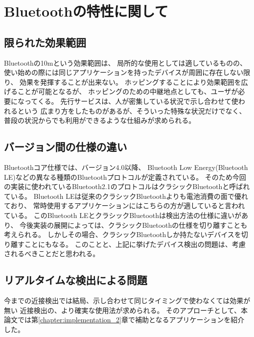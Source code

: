 \section{Bluetoothの特性に関して}

\subsection{限られた効果範囲}

Bluetoothの10mという効果範囲は、
局所的な使用としては適しているものの、
使い始めの際には同じアプリケーションを持ったデバイスが周囲に存在しない限り、
効果を発揮することが出来ない。
ホッピングすることにより効果範囲を広げることが可能となるが、
ホッピングのための中継地点としても、ユーザが必要になってくる。
先行サービスは、人が密集している状況で示し合わせて使われるという
広まり方をしたものがあるが、そういった特殊な状況だけでなく、
普段の状況からでも利用ができるような仕組みが求められる。

\subsection{バージョン間の仕様の違い}

Bluetoothコア仕様では、バージョン4.0以降、
Bluetooth Low Energy(Bluetooth LE)などの異なる種類のBluetoothプロトコルが定義されている。
そのため今回の実装に使われているBluetooth2.1のプロトコルはクラシックBluetoothと呼ばれている。
Bluetooth LEは従来のクラシックBluetoothよりも電池消費の面で優れており、
常時使用するアプリケーションにはこちらの方が適していると言われている。
このBluetooth LEとクラシックBluetoothは検出方法の仕様に違いがあり、
今後実装の展開によっては、クラシックBluetoothの仕様を切り離すことも考えられる。
しかしその場合、クラシックBluetoothしか持たないデバイスを切り離すことにもなる。
このことと、上記に挙げたデバイス検出の問題は、考慮されるべきことだと思われる。

\subsection{リアルタイムな検出による問題}

今までの近接検出では結局、示し合わせて同じタイミングで使わなくては効果が無い
近接検出の、より確実な使用法が求められる。
そのアプローチとして、本論文では第\ref{chapter:implementation_2}章で補助となるアプリケーションを紹介した。
